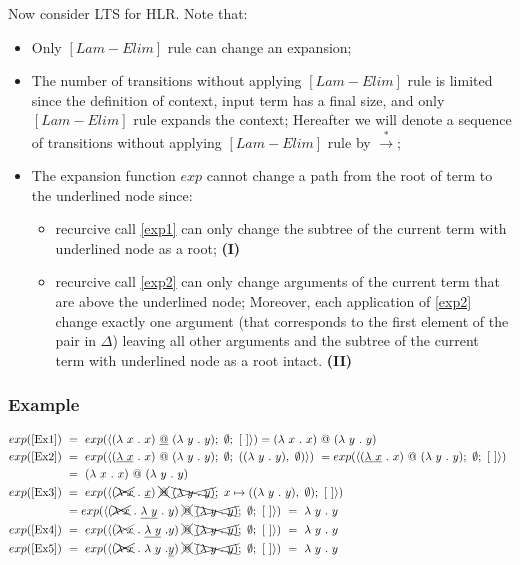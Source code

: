 \documentclass[a4paper, 10pt]{article}
\begin{document}
Now consider LTS for HLR. Note that:
\begin{itemize}
\item Only $[Lam-Elim]$ rule can change an expansion;
\item The number of transitions without applying $[Lam-Elim]$ rule is limited since the definition of context, input term has a final size, and only $[Lam-Elim]$ rule expands the context; Hereafter we will denote a sequence of transitions without applying $[Lam-Elim]$ rule by $\overset{*}{\rightarrow}$;
\item The expansion function $exp$ cannot change a path from the root of term to the underlined node since:
  \begin{itemize}
  \item recurcive call \eqref{exp1} can only change the subtree of the current term with underlined node as a root; \hfill{\textbf{(I)}}
  \item recurcive call \eqref{exp2} can only change arguments of the current term that are above the underlined node; Moreover, each application of \eqref{exp2} change exactly one argument (that corresponds to the first element of the pair in $\Delta$) leaving all other arguments and the subtree of the current term with underlined node as a root intact. \hfill{\textbf{(II)}}
  \end{itemize}
\end{itemize}

\subsubsection{Example}
\begin{align*}
  exp (\textnormal{\eqref{Ex1}})\ & =\  exp (\langle (\lambda \ x\ .\ x)\ \underline{@}\ (\lambda \ y\ .\  y);\ \emptyset;\ [\ ]
  \rangle) =  (\lambda \ x\ .\ x)\ @\ (\lambda \ y\ .\  y) \\
  exp (\textnormal{\eqref{Ex2}})\ & =\ exp ( \langle (\underline{\lambda \ x}\ .\ x)\ @\ (\lambda \ y\ .\  y);\ \emptyset;\
  ((\lambda\ y\ .\ y),\ \emptyset)  \rangle)\ =
  exp ( \langle (\underline{\lambda \ x}\ .\ x)\ @\ (\lambda \ y\ .\  y);\ \emptyset;\
  [\ ]  \rangle)\ \\ & = \ (\lambda \ x\ .\ x)\ @\ (\lambda \ y\ .\  y) \\
  exp (\textnormal{\eqref{Ex3}})\ & =\ exp ( \langle (\xcancel{\lambda \ x}\ .\ \underline{x})\ \xcancel{@}\
  \xcancel{(\lambda \ y\ .\  y)};\ x \mapsto ((\lambda\ y\ .\ y),\ \emptyset);\ [\ ] \rangle ) \\
  & =  exp ( \langle (\xcancel{\lambda \ x}\ .\ \underline{\lambda\ y}\ .\ y)\ \xcancel{@}\
  \xcancel{(\lambda \ y\ .\  y)};\ \emptyset;\ [\ ] \rangle )\ =\ \lambda\ y\ .\ y\\
  exp (\textnormal{\eqref{Ex4}})\ & =\ exp (\langle (\xcancel{\lambda \ x}\ .\ \underline{\lambda \ y}\ . y )\
  \xcancel{@}\ \xcancel{(\lambda \ y\ .\  y)};\ \emptyset; \ [\ ] \rangle)\ =\ \lambda \ y\ .\ y \\
  exp (\textnormal{\eqref{Ex5}})\ & =\ exp (\langle (\xcancel{\lambda \ x}\ .\ \lambda \ y\ . \underline{y} )\
  \xcancel{@}\ \xcancel{(\lambda \ y\ .\  y)};\ \emptyset; \ [\ ] \rangle) \ = \ \lambda \ y\ .\ y
\end{align*}
\end{document}
